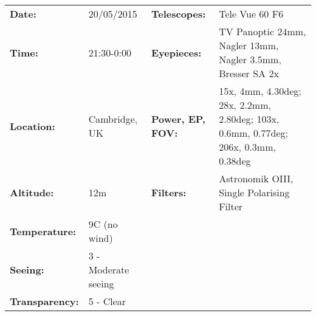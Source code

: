 \begin{tabular}{ p{0.9in} p{1.3in} p{1.2in} p{5.2in}}
{\bf Date:} & 20/05/2015 & {\bf Telescopes:} & Tele Vue 60 F6 \\ 
{\bf Time:} & 21:30-0:00 & {\bf Eyepieces:} & TV Panoptic 24mm, Nagler 13mm, Nagler 3.5mm, Bresser SA 2x \\ 
{\bf Location:} & Cambridge, UK & {\bf Power, EP, FOV:} & 15x, 4mm, 4.30deg; 28x, 2.2mm, 2.80deg; 103x, 0.6mm, 0.77deg; 206x, 0.3mm, 0.38deg \\ 
{\bf Altitude:} & 12m & {\bf Filters:} & Astronomik OIII, Single Polarising Filter \\ 
{\bf Temperature:} & 9C (no wind) & & \\ 
{\bf Seeing:} & 3 - Moderate seeing & & \\ 
{\bf Transparency:} & 5 - Clear & & \\ 
\end{tabular}

